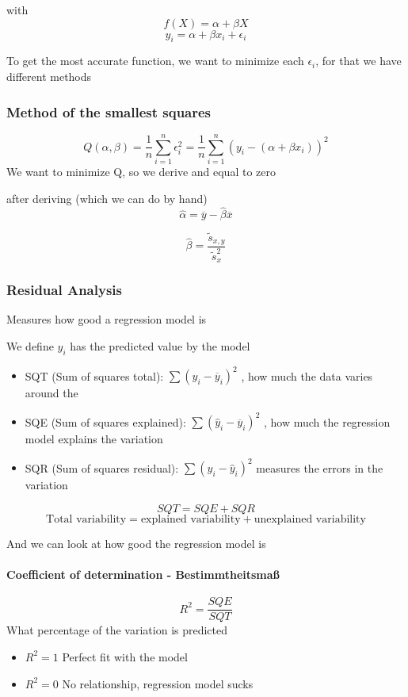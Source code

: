 \documentclass{article}
\begin{document}
with
\[f(X) = \alpha + \beta X\]
\[y_i = \alpha + \beta x_i + \epsilon_i\]

To get the most accurate function, we want to minimize each $\epsilon_i$, for that we have different methods

\subsubsection{Method of the smallest squares}
\[Q(\alpha,\beta)= \frac{1}{n}\sum_{i=1}^n\epsilon_i^2 = \frac{1}{n}\sum_{i=1}^n(y_i-(\alpha + \beta x_i))^2\]
We want to minimize Q, so we derive and equal to zero

after deriving (which we can do by hand)
\[\hat{\alpha} = \overline{y} - \hat{\beta}\overline{x} \]

\[\hat{\beta} = \frac{\tilde{s}_{x,y}}{\tilde{s}_x^2} \]

\subsubsection{Residual Analysis}
Measures how good a regression model is

We define $\hat{y}_i$ has the predicted value by the model
\begin{itemize}
    \item SQT (Sum of squares total): $\sum(y_i-\overline{y}_i)^2$ , how much the data varies around the 
    \item SQE (Sum of squares explained): $\sum(\hat{y}_i - \overline{y}_i)^2$ , how much the regression model explains the variation
    \item SQR (Sum of squares residual): $\sum(y_i - \hat{y}_i)^2$ measures the errors in the variation
\end{itemize}

\[SQT = SQE + SQR\]
\[\text{Total variability} = \text{explained variability} + \text{unexplained variability}\]

And we can look at how good the regression model is

\paragraph{Coefficient of determination - Bestimmtheitsmaß}
\[R^2 = \frac{SQE}{SQT}\]
What percentage of the variation is predicted
\begin{itemize}
    \item $R^2 = 1 $ Perfect fit with the model
    \item $R^2 = 0$ No relationship, regression model sucks
\end{itemize}
\end{document}
